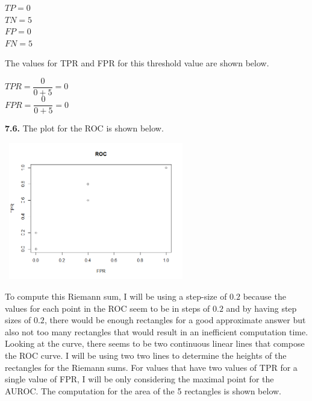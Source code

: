 \documentclass[12pt]{article}
\begin{document}
\begin{center}

$TP=0$\\
$TN=5$\\
$FP=0$\\
$FN=5$\\

\end{center}

The values for TPR and FPR for this threshold value are shown below.

\begin{center}

$TPR=\dfrac{0}{0+5}=0$\\
\bigskip
$FPR=\dfrac{0}{0+5}=0$\\

\end{center}

{\bf 7.6.} The plot for the ROC is shown below.

\begin{center}

\includegraphics[width=8cm, height=6cm]{ROC_Plot}

\end{center}

To compute this Riemann sum, I will be using a step-size of $0.2$ because the values for each point in the ROC seem to be in steps of $0.2$ and by having step sizes of $0.2$, there would be enough rectangles for a good approximate answer but also not too many rectangles that would result in an inefficient computation time. Looking at the curve, there seems to be two continuous linear lines that compose the ROC curve. I will be using two two lines to determine the heights of the rectangles for the Riemann sums. For values that have two values of TPR for a single value of FPR, I will be only considering the maximal point for the AUROC. The computation for the area of the 5 rectangles is shown below.
\end{document}
